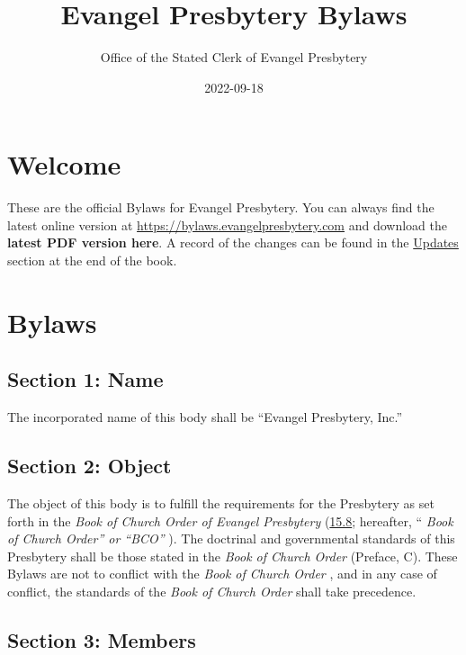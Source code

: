 \documentclass[
]{book}
\title{Evangel Presbytery Bylaws}
\author{Office of the Stated Clerk of Evangel Presbytery}
\date{2022-09-18}
\begin{document}
\maketitle

{
\hypersetup{linkcolor=}
\setcounter{tocdepth}{1}
\tableofcontents
}
\hypertarget{welcome}{%
\chapter{Welcome}\label{welcome}}

These are the official Bylaws for Evangel Presbytery. You can always find the latest online version at \url{https://bylaws.evangelpresbytery.com} and download the \textbf{latest PDF version here}. A record of the changes can be found in the \href{https://bylaws.evangelpresbytery.com/updates.html}{Updates} section at the end of the book.

\hypertarget{bylaws}{%
\chapter{Bylaws}\label{bylaws}}

\hypertarget{section-1-name}{%
\section{Section 1: Name}\label{section-1-name}}

The incorporated name of this body shall be ``Evangel Presbytery, Inc.''

\hypertarget{section-2-object}{%
\section{Section 2: Object}\label{section-2-object}}

The object of this body is to fulfill the requirements for the Presbytery as set forth in the \emph{Book of Church Order of Evangel Presbytery} (\href{https://bco.evangelpresbytery.com/form-of-government.html\#the-presbytery}{15.8}; hereafter, `` \emph{Book of Church Order'' or ``BCO''} ). The doctrinal and governmental standards of this Presbytery shall be those stated in the \emph{Book of Church Order} (Preface, C). These Bylaws are not to conflict with the \emph{Book of Church Order} , and in any case of conflict, the standards of the \emph{Book of Church Order} shall take precedence.

\hypertarget{section-3-members}{%
\section{Section 3: Members}\label{section-3-members}}
\end{document}
